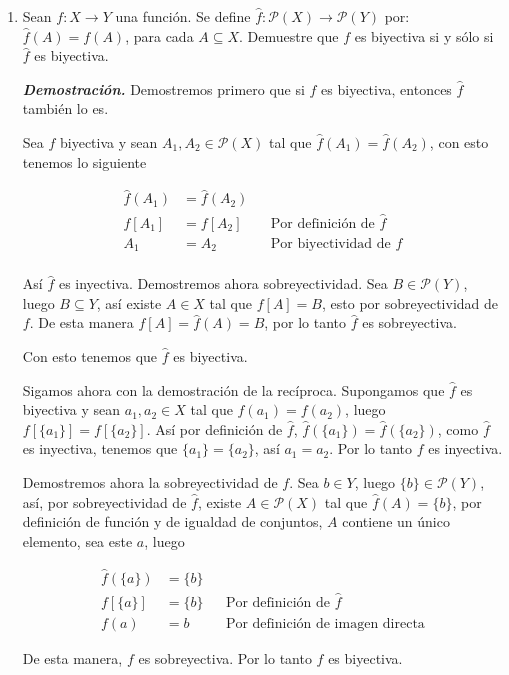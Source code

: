 \documentclass{report}
\begin{document}
\begin{enumerate}
    \item Sean $f: X \to Y$ una función. Se define $\hat{f}: \mathcal{P}(X) \to \mathcal{P}(Y)$ por: $\hat{f}(A) = f(A)$, para cada $A \subseteq X$. Demuestre que $f$ es biyectiva si y sólo si $\hat{f}$ es biyectiva.

    \textit{\textbf{Demostración.}} Demostremos primero que si $f$ es biyectiva, entonces $\hat{f}$ también lo es.

    Sea $f$ biyectiva y sean $A_1, A_2 \in \mathcal{P}(X)$ tal que $\hat{f}(A_1) = \hat{f}(A_2)$, con esto tenemos lo siguiente

    \begin{align*}
        \hat{f}(A_1) &= \hat{f}(A_2)\\
        f[A_1] &= f[A_2] &&\text{Por definición de } \hat{f}\\
        A_1 &= A_2 &&\text{Por biyectividad de } f\\
    \end{align*}

    Así $\hat{f}$ es inyectiva. Demostremos ahora sobreyectividad. Sea $B \in \mathcal{P}(Y)$, luego $B \subseteq Y$, así existe $A \in X$ tal que $f[A] = B$, esto por sobreyectividad de $f$. De esta manera $f[A] = \hat{f}(A) = B$, por lo tanto $\hat{f}$ es sobreyectiva.

    Con esto tenemos que $\hat{f}$ es biyectiva.

    Sigamos ahora con la demostración de la recíproca. Supongamos que $\hat{f}$ es biyectiva y sean $a_1, a_2 \in X$ tal que $f(a_1) = f(a_2)$, luego $f[\{a_1\}] = f[\{a_2\}]$. Así por definición de $\hat{f}$, $\hat{f}(\{a_1\}) = \hat{f}(\{a_2\})$, como $\hat{f}$ es inyectiva, tenemos que $\{a_1\} = \{a_2\}$, así $a_1 = a_2$. Por lo tanto $f$ es inyectiva.

    Demostremos ahora la sobreyectividad de $f$. Sea $b \in Y$, luego $\{b\} \in \mathcal{P}(Y)$, así, por sobreyectividad de $\hat{f}$, existe $A \in \mathcal{P}(X)$ tal que $\hat{f}(A) = \{b\}$, por definición de función y de igualdad de conjuntos, $A$ contiene un único elemento, sea este $a$, luego

    \begin{align*}
        \hat{f}(\{a\}) &= \{b\}\\
        f[\{a\}] &= \{b\} &&\text{Por definición de } \hat{f}\\
        f(a) &= b &&\text{Por definición de imagen directa}
    \end{align*}

    De esta manera, $f$ es sobreyectiva. Por lo tanto $f$ es biyectiva.


\end{enumerate}
\end{document}

